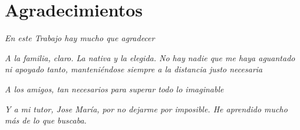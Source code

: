 \chapter*{Agradecimientos}
\thispagestyle{empty}
\label{cap:agradecimientos}

\begin{flushright}

	\textit{En este Trabajo hay mucho que agradecer}
	
		\vspace{2cm}
	\textit{A la familia, claro. La nativa y la elegida. No hay nadie que me haya aguantado ni apoyado tanto, manteniéndose siempre a la distancia justo necesaria}
	
		\vspace{1cm}
	\textit{A los amigos, tan necesarios para superar todo lo imaginable}
	
	\vspace{1cm}
	\textit{Y a mi tutor, Jose María, por no dejarme por imposible. He aprendido mucho más de lo que buscaba.}
\end{flushright}

\afterpage{\null\newpage}
\pagestyle{empty}